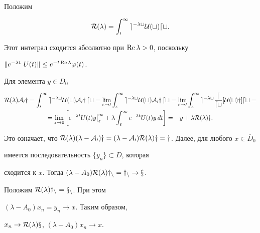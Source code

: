 \begin{pf}


Положим


\begin{equation}


\cal{R}(\lambda)=\int^{\infty}_{0} e^{-\lambda t}U(t) d t.


\end{equation}


Этот интеграл сходится абсолютно при $\operatorname{Re} \lambda > 0$, поскольку


$\| e^{-\lambda t} \ U(t)\| \leq


e^{-t\re \lambda}\varphi(t)$.


Для элемента $y\in D_{0}$


\begin{multline*}


\cal{R}(\lambda)A_{0}y=


\int^{\infty}_{0}e^{-\lambda t}U(t)A_{0} y\,dt=


\lim_{\varepsilon\to 0}


\int^{\infty}_{\varepsilon} e^{-\lambda t} U(t)A_{0}y\,dt=


\lim_{\varepsilon\to 0}


\int^{\infty}_{\varepsilon} e^{-\lambda t}


\frac{d}{dt}[U(t) y ] dt= \\


%


=\lim_{\varepsilon\to 0}\bigg[


e^{-\lambda t} U(t)y


\big|^{\infty}_{\varepsilon}+\lambda


\int^{\infty}_{\varepsilon} e^{-\lambda t} U(t)y\,dt\bigg]=


-y+\lambda \cal{R}(\lambda)y.


\end{multline*}


Это означает, что $\cal{R}(\lambda)(\lambda-A_{0})y=


(\lambda-A_{0})\cal{R}(\lambda)y=y$. Далее, для любого $x\in \overline{D}_{0}$


имеется последовательность $\{ y_{n} \}\subset D$, которая


сходится к $x$. Тогда $(\lambda-A_{0})\cal{R}(\lambda)y_{n}=y_{n}\to x$.


Положим $\cal{R}(\lambda)y_{n}=x_{n}$. При этом


$(\lambda-A_{0})x_{n}=y_{n}\to x$. Таким образом,


$x_{n}\to \cal{R}(\lambda)x$, $(\lambda-A_{0})x_{n}\to  x$.






\end{pf}
